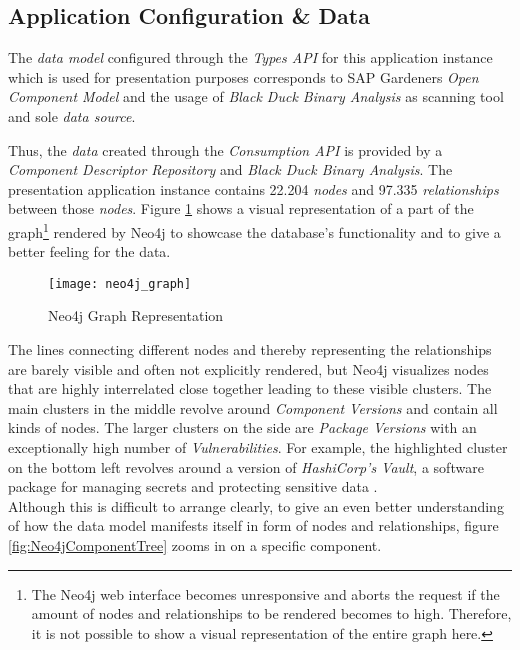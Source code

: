 \subsection{Application Configuration \& Data}
The \emph{data model} configured through the \emph{Types API} for this application instance which is used for presentation purposes corresponds to SAP Gardeners \emph{Open Component Model} and the usage of \emph{Black Duck Binary Analysis} as scanning tool and sole \emph{data source}.\par
Thus, the \emph{data} created through the \emph{Consumption API} is provided by a \emph{Component Descriptor Repository} and \emph{Black Duck Binary Analysis}. The presentation application instance contains 22.204 \emph{nodes} and 97.335 \emph{relationships} between those \emph{nodes}. Figure \ref{fig:Neo4jGraph} shows a visual representation of a part of the graph\footnote{The Neo4j web interface becomes unresponsive and aborts the request if the amount of nodes and relationships to be rendered becomes to high. Therefore, it is not possible to show a visual representation of the entire graph here.} rendered by Neo4j to showcase the database's functionality and to give a better feeling for the data.\par

\begin{figure}[H]
	\centering
	\texttt{[image: neo4j\_graph]}
	\caption[Neo4j Graph]{Neo4j Graph Representation }
	\label{fig:Neo4jGraph}
\end{figure}

The lines connecting different nodes and thereby representing the relationships are barely visible and often not explicitly rendered, but Neo4j visualizes nodes that are highly interrelated close together leading to these visible clusters. The main clusters in the middle revolve around \emph{Component Versions} and contain all kinds of nodes. The larger clusters on the side are \emph{Package Versions} with an exceptionally high number of \emph{Vulnerabilities}. For example, the highlighted cluster on the bottom left revolves around a version of \emph{HashiCorp's Vault}, a software package for managing secrets and protecting sensitive data \cite{vault}.\\

Although this is difficult to arrange clearly, to give an even better understanding of how the data model manifests itself in form of nodes and relationships, figure \ref{fig:Neo4jComponentTree} zooms in on a specific component.

